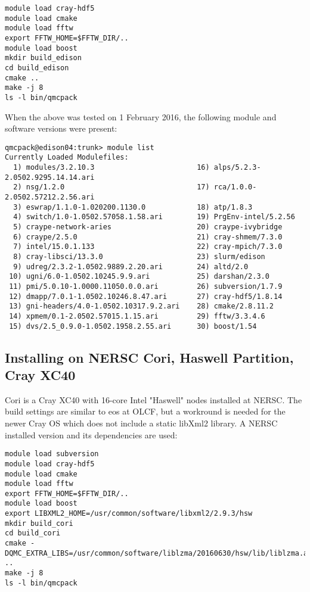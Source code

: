 \begin{verbatim}
module load cray-hdf5
module load cmake
module load fftw
export FFTW_HOME=$FFTW_DIR/..
module load boost
mkdir build_edison
cd build_edison
cmake ..
make -j 8  
ls -l bin/qmcpack 
\end{verbatim}
When the above was tested on 1 February 2016, the following module and
software versions were present:
\begin{verbatim}
qmcpack@edison04:trunk> module list
Currently Loaded Modulefiles:
  1) modules/3.2.10.3                        16) alps/5.2.3-2.0502.9295.14.14.ari      
  2) nsg/1.2.0                               17) rca/1.0.0-2.0502.57212.2.56.ari       
  3) eswrap/1.1.0-1.020200.1130.0            18) atp/1.8.3                             
  4) switch/1.0-1.0502.57058.1.58.ari        19) PrgEnv-intel/5.2.56                   
  5) craype-network-aries                    20) craype-ivybridge                      
  6) craype/2.5.0                            21) cray-shmem/7.3.0                      
  7) intel/15.0.1.133                        22) cray-mpich/7.3.0                     
  8) cray-libsci/13.3.0                      23) slurm/edison                         
  9) udreg/2.3.2-1.0502.9889.2.20.ari        24) altd/2.0                             
 10) ugni/6.0-1.0502.10245.9.9.ari           25) darshan/2.3.0                        
 11) pmi/5.0.10-1.0000.11050.0.0.ari         26) subversion/1.7.9                     
 12) dmapp/7.0.1-1.0502.10246.8.47.ari       27) cray-hdf5/1.8.14                     
 13) gni-headers/4.0-1.0502.10317.9.2.ari    28) cmake/2.8.11.2                       
 14) xpmem/0.1-2.0502.57015.1.15.ari         29) fftw/3.3.4.6                         
 15) dvs/2.5_0.9.0-1.0502.1958.2.55.ari      30) boost/1.54                           
\end{verbatim}

\subsection{Installing on NERSC Cori, Haswell Partition, Cray XC40}
Cori is a Cray XC40 with 16-core Intel "Haswell" nodes 
installed at NERSC. The build settings are similar to eos at OLCF, but
a workround is needed for the newer Cray OS which does not include a static
libXml2 library. A NERSC installed version and its dependencies are used:

\begin{verbatim}
module load subversion
module load cray-hdf5
module load cmake
module load fftw
export FFTW_HOME=$FFTW_DIR/..
module load boost
export LIBXML2_HOME=/usr/common/software/libxml2/2.9.3/hsw 
mkdir build_cori
cd build_cori
cmake -DQMC_EXTRA_LIBS=/usr/common/software/liblzma/20160630/hsw/lib/liblzma.a ..
make -j 8  
ls -l bin/qmcpack 
\end{verbatim}

